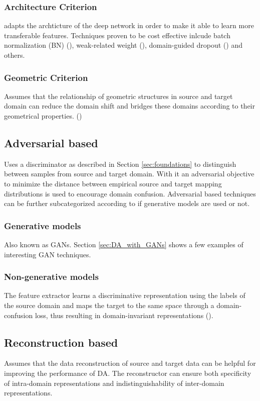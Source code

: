 \subsubsection{Architecture Criterion}
adapts the archticture of the deep network in order to make it able to learn more transferable features. Techniques proven to be cost effective inlcude batch normalization (BN) (), weak-related weight (), domain-guided dropout () and others. 

\subsubsection{Geometric Criterion}
Assumes that the relationship of geometric structures in source and target domain can reduce the domain shift and bridges these domains according to their geometrical properties. ()

\subsection{Adversarial based}
Uses a discriminator as described in Section \ref{sec:foundations} to distinguish between samples from source and target domain. With it an adversarial objective to minimize the distance between empirical source and target mapping distributions is used to encourage domain confusion. Adversarial based techniques can be further subcategorized according to if generative models are used or not.

\subsubsection{Generative models}
Also known as GANs. Section \ref{sec:DA_with_GANs} shows a few examples of interesting GAN techniques.

\subsubsection{Non-generative models}
The feature extractor learns a discriminative representation using the labels of the source domain and maps the target to the same space through a domain-confusion loss, thus resulting in domain-invariant representations (). 

\subsection{Reconstruction based}
Assumes that the data reconstruction of source and target data can be helpful for improving the performance of DA. The reconstructor can ensure both specificity of intra-domain representations and indistinguishability of inter-domain representations.

